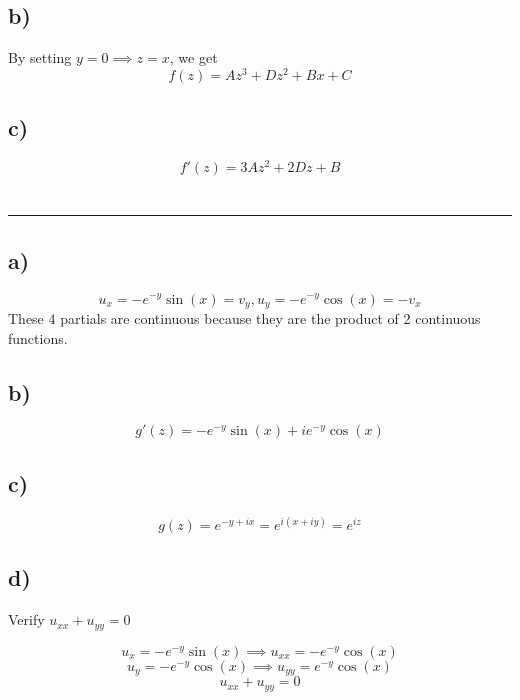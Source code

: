 \documentclass[12pt]{article}
\begin{document}
\subsection{b)}
By setting $ y=0 \implies z = x $, we get 
\[ f(z) = Az^3 + Dz^2 + Bx + C\]

\subsection{c)}
\[f'(z) = 3Az^2 + 2Dz + B\]
\newpage
\section{}\hrule
\subsection{a)}
\[u_x = -e^{-y}\sin{(x)} = v_y, u_y = -e^{-y}\cos{(x)} = -v_x\]
These 4 partials are continuous because they are the product of 2 continuous functions.
\subsection{b)}
\[g'(z) = -e^{-y}\sin{(x)} + ie^{-y}\cos{(x)}\]
\subsection{c)}
\[g(z) = e^{-y+ix} = e^{i(x+iy)} = e^{iz}\]
\subsection{d)}

Verify $ u_{xx} + u_{yy} = 0 $

\[u_x = -e^{-y}\sin{(x)} \implies u_{xx} = -e^{-y}\cos{(x)}\]
\[u_y = -e^{-y}\cos{(x)} \implies u_{yy} = e^{-y}\cos{(x)}\]
\[u_{xx} + u_{yy} = 0\]
\end{document}
